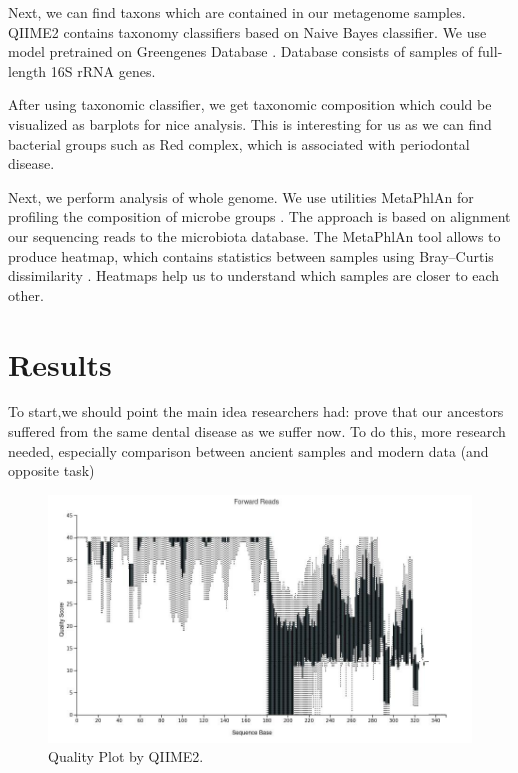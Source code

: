 \documentclass{article}
\begin{document}
 Next, we can find taxons which are contained in our metagenome samples. QIIME2 contains taxonomy classifiers based on Naive Bayes classifier. We use model pretrained on Greengenes Database \cite{Green}. Database consists of samples of full-length 16S rRNA genes. 
 
 After using taxonomic classifier, we get taxonomic composition which could be visualized as barplots for nice analysis. This is interesting for us as we can find bacterial groups such as Red complex, which is associated with periodontal disease. 
 
 Next, we perform analysis of whole genome. We use utilities MetaPhlAn for profiling the composition of microbe groups \cite{Met}. The approach is based on alignment our sequencing reads to the microbiota database. The MetaPhlAn tool allows to produce  heatmap, which contains statistics between samples using Bray–Curtis dissimilarity \cite{BC}. Heatmaps help us to understand which samples are closer to each other. 
 
 \section{Results}
 
To start,we should point the main idea researchers had: prove that our ancestors suffered from the same dental disease as we suffer now. To do this, more research needed, especially comparison between ancient samples and modern data (and opposite task)
 
\begin{figure}[h]
	\centering
	\includegraphics[scale=0.77]{1}  
	\caption{Quality Plot by QIIME2.}
	\label{heatmap1}
\end{figure}
\end{document}
